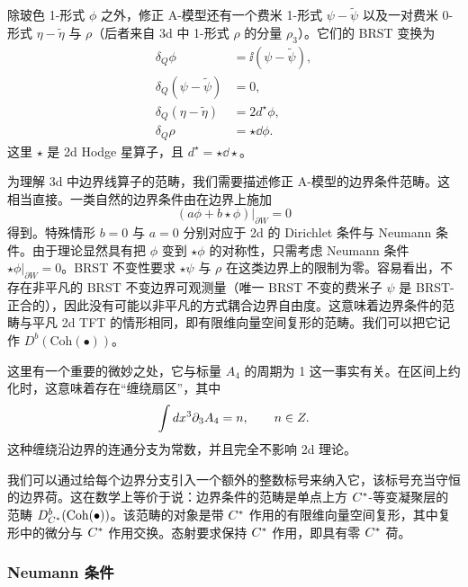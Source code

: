 除玻色 1-形式 $\phi$ 之外，修正 A-模型还有一个费米 1-形式 $\psi-\tilde\psi$ 以及一对费米 0-形式 $\eta-\tilde\eta$ 与 $\rho$（后者来自 3d 中 1-形式 $\rho$ 的分量 $\rho_3$）。它们的 BRST 变换为
\[
\begin{aligned}
  \delta_Q\phi &= \ii(\psi-\tilde\psi),\\
  \delta_Q(\psi-\tilde\psi) &= 0,\\
  \delta_Q(\eta-\tilde\eta) &= 2d^{\star}\phi,\\
  \delta_Q\rho &= \star\dd\phi .
\end{aligned}
\]
这里 $\star$ 是 2d Hodge 星算子，且 $d^{\star}=\star\dd\star$。

为理解 3d 中边界线算子的范畴，我们需要描述修正 A-模型的边界条件范畴。这相当直接。一类自然的边界条件由在边界上施加
\[
  (a\phi+b\star\phi)|_{\partial W}=0
\]
得到。特殊情形 $b=0$ 与 $a=0$ 分别对应于 2d 的 Dirichlet 条件与 Neumann 条件。由于理论显然具有把 $\phi$ 变到 $\star\phi$ 的对称性，只需考虑 Neumann 条件 $\star\phi|_{\partial W}=0$。BRST 不变性要求 $\star\psi$ 与 $\rho$ 在这类边界上的限制为零。容易看出，不存在非平凡的 BRST 不变边界可观测量（唯一 BRST 不变的费米子 $\psi$ 是 BRST-正合的），因此没有可能以非平凡的方式耦合边界自由度。这意味着边界条件的范畴与平凡 2d TFT 的情形相同，即有限维向量空间复形的范畴。我们可以把它记作 $D^b(\mathrm{Coh}(\bullet))$。

这里有一个重要的微妙之处，它与标量 $A_4$ 的周期为 1 这一事实有关。在区间上约化时，这意味着存在“缠绕扇区”，其中
\[
  \int d x^3\partial_3A_4=n,\qquad n\in Z .
\]
这种缠绕沿边界的连通分支为常数，并且完全不影响 2d 理论。


我们可以通过给每个边界分支引入一个额外的整数标号来纳入它，该标号充当守恒的边界荷。这在数学上等价于说：边界条件的范畴是单点上方 $C^*$-等变凝聚层的范畴 $D^b_{C^*}(\mathrm{Coh}(\bullet))$。该范畴的对象是带 $C^*$ 作用的有限维向量空间复形，其中复形中的微分与 $C^*$ 作用交换。态射要求保持 $C^*$ 作用，即具有零 $C^*$ 荷。

\subsubsection{Neumann 条件}

